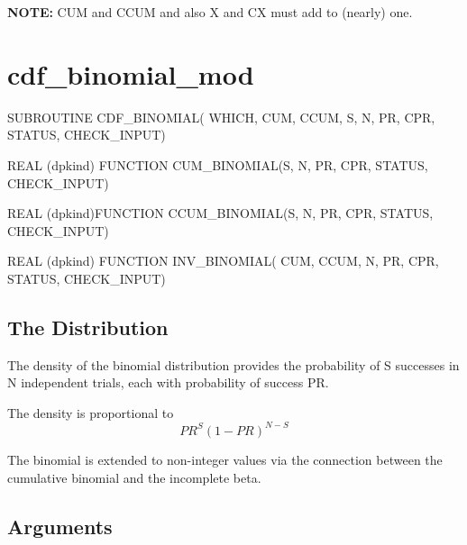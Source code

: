 \documentclass[12pt,dvips]{article}
\newcommand{\mysection}[1]{\color{blue}
             \section{#1} \normalcolor}
\newcommand{\mysubsection}[1] {\color{green}
             \subsection{#1} \normalcolor}
\begin{document}
{\bf NOTE:} CUM and CCUM and also X and CX must add to (nearly) one.

\pagebreak

\mysection{cdf\_binomial\_mod}

\begin{description}

\item SUBROUTINE CDF\_BINOMIAL( WHICH, CUM, CCUM, S, N, PR, CPR,
STATUS, CHECK\_INPUT)

\item    REAL   (dpkind)   FUNCTION    CUM\_BINOMIAL(S,
N, PR, CPR, STATUS, CHECK\_INPUT)

\item    REAL    (dpkind)FUNCTION    CCUM\_BINOMIAL(S,
N, PR, CPR,  STATUS, CHECK\_INPUT)

\item  REAL (dpkind) FUNCTION  INV\_BINOMIAL(  CUM, CCUM,
N, PR, CPR, STATUS, CHECK\_INPUT)

\end{description}

\mysubsection{The Distribution}

The density of the binomial distribution provides the probability of S
successes in N independent trials, each with probability of success
PR.

The density is proportional to
\[ PR^S (1-PR)^{N-S} \]

The  binomial is  extended  to non-integer  values  via the  connection
between the cumulative binomial and the incomplete beta.

\mysubsection{Arguments}
\end{document}
